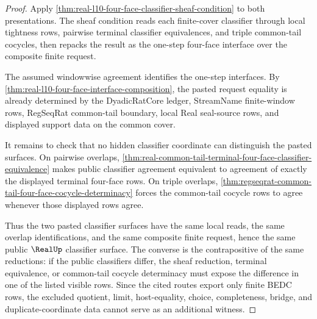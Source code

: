 \begin{proof}
Apply \autoref{thm:real-l10-four-face-classifier-sheaf-condition} to both presentations. The sheaf condition reads each finite-cover classifier through local tightness rows, pairwise terminal classifier equivalences, and triple common-tail cocycles, then repacks the result as the one-step four-face interface over the composite finite request.

The assumed windowwise agreement identifies the one-step interfaces. By \autoref{thm:real-l10-four-face-interface-composition}, the pasted request equality is already determined by the DyadicRatCore ledger, StreamName finite-window rows, RegSeqRat common-tail boundary, local Real seal-source rows, and displayed support data on the common cover.

It remains to check that no hidden classifier coordinate can distinguish the pasted surfaces. On pairwise overlaps, \autoref{thm:real-common-tail-terminal-four-face-classifier-equivalence} makes public classifier agreement equivalent to agreement of exactly the displayed terminal four-face rows. On triple overlaps, \autoref{thm:regseqrat-common-tail-four-face-cocycle-determinacy} forces the common-tail cocycle rows to agree whenever those displayed rows agree.

Thus the two pasted classifier surfaces have the same local reads, the same overlap identifications, and the same composite finite request, hence the same public $\RealUp$ classifier surface. The converse is the contrapositive of the same reductions: if the public classifiers differ, the sheaf reduction, terminal equivalence, or common-tail cocycle determinacy must expose the difference in one of the listed visible rows. Since the cited routes export only finite BEDC rows, the excluded quotient, limit, host-equality, choice, completeness, bridge, and duplicate-coordinate data cannot serve as an additional witness.
\end{proof}

